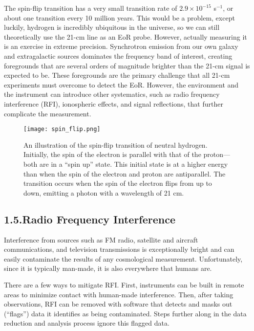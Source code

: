 \documentclass[12pt]{article}
\begin{document}
The spin-flip transition has a very small transition rate of $2.9 \times 10^{-15}$ s$^{-1}$, or about one transition every 10 million years. This would be a problem, except luckily, hydrogen is incredibly ubiquitous in the universe, so we can still theoretically use the 21-cm line as an EoR probe. However, actually measuring it is an exercise in extreme precision. Synchrotron emission from our own galaxy and extragalactic sources dominates the frequency band of interest, creating foregrounds that are several orders of magnitude brighter than the 21-cm signal is expected to be. These foregrounds are the primary challenge that all 21-cm experiments must overcome to detect the EoR. However, the environment and the instrument can introduce other systematics, such as radio frequency interference (RFI), ionospheric effects, and signal reflections, that further complicate the measurement. \vspace{3mm}

\begin{figure}[t]
	\centering
	\texttt{[image: spin\_flip.png]}
	\caption[The spin-flip transition of neutral hydrogen]{An illustration of the spin-flip transition of neutral hydrogen. Initially, the spin of the electron is parallel with that of the proton---both are in a ``spin up'' state. This initial state is at a higher energy than when the spin of the electron and proton are antiparallel. The transition occurs when the spin of the electron flips from up to down, emitting a photon with a wavelength of 21 cm.}
	\label{fig:spin_flip}
\end{figure}

\tocless\subsection{\hypertarget{subsec:rfi}{1.5.\hspace{0.75em}Radio Frequency Interference}}

Interference from sources such as FM radio, satellite and aircraft communications, and television transmissions is exceptionally bright and can easily contaminate the results of any cosmological measurement. Unfortunately, since it is typically man-made, it is also everywhere that humans are.

There are a few ways to mitigate RFI. First, instruments can be built in remote areas to minimize contact with human-made interference. Then, after taking observations, RFI can be removed with software that detects and masks out (``flags'') data it identifies as being contaminated. Steps further along in the data reduction and analysis process ignore this flagged data.
\end{document}
